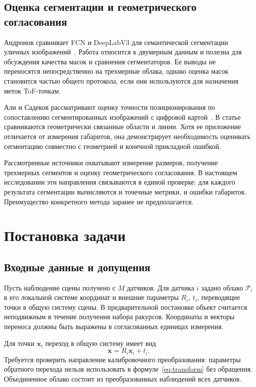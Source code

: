 \documentclass{misisarticle}
\begin{document}
\subsection{Оценка сегментации и геометрического согласования}

Андронов сравнивает FCN и DeepLabV3 для семантической сегментации уличных изображений~\cite{andronov2025}. Работа относится к двумерным данным и полезна для обсуждения качества масок и сравнения сегментаторов. Ее выводы не переносятся непосредственно на трехмерные облака, однако оценка масок становится частью общего протокола, если они используются для назначения меток ToF-точкам.

Али и Садеков рассматривают оценку точности позиционирования по сопоставлению сегментированных изображений с цифровой картой~\cite{ali2025}. В статье сравниваются геометрически связанные области и линии. Хотя ее приложение отличается от измерения габаритов, она демонстрирует необходимость оценивать сегментацию совместно с геометрией и конечной прикладной ошибкой.

Рассмотренные источники охватывают измерение размеров, получение трехмерных сегментов и оценку геометрического согласования. В настоящем исследовании эти направления связываются в единой проверке: для каждого результата сегментации вычисляются и точечные метрики, и ошибки габаритов. Преимущество конкретного метода заранее не предполагается.

\section{Постановка задачи}

\subsection{Входные данные и допущения}

Пусть наблюдение сцены получено с $M$ датчиков. Для датчика $i$ задано облако $\mathcal{P}_i$ в его локальной системе координат и внешние параметры $R_i$, $t_i$, переводящие точки в общую систему сцены. В предварительной постановке объект считается неподвижным в течение получения набора ракурсов. Координаты и векторы переноса должны быть выражены в согласованных единицах измерения.

Для точки $\mathbf{x}_i$ переход в общую систему имеет вид
\begin{equation}
    \mathbf{x}=R_i\mathbf{x}_i+t_i.
    \label{eq:transform}
\end{equation}
Требуется проверить направление калибровочного преобразования: параметры обратного перехода нельзя использовать в формуле~\eqref{eq:transform} без обращения. Объединенное облако состоит из преобразованных наблюдений всех датчиков.
\end{document}
